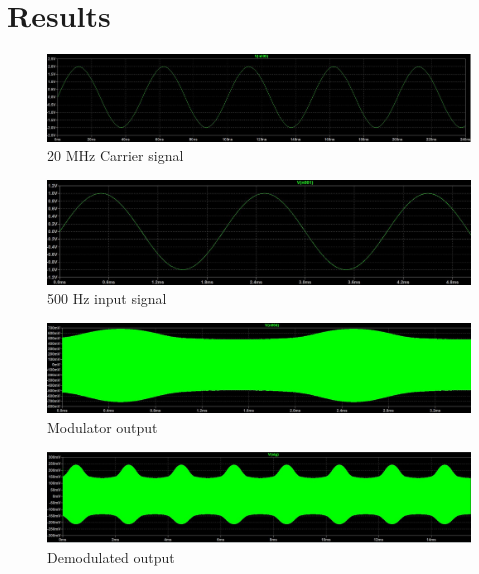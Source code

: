 \documentclass[12pt, a4paper]{article}
\begin{document}

\section{Results} %
\label{sec:results}
	\begin{figure}[H]
		\centering
		\includegraphics[width=\textwidth]{images/carrier.JPG}
		\caption{20 MHz Carrier signal}
		\label{fig:carrier}
	\end{figure}

	\begin{figure}[H]
		\centering
		\includegraphics[width=\textwidth]{images/modulating.JPG}
		\caption{500 Hz input signal}
		\label{fig:modulating}
	\end{figure}

	\begin{figure}[H]
		\centering
		\includegraphics[width=\textwidth]{images/output_modulated.JPG}
		\caption{Modulator output}
		\label{fig:output_modulated}
	\end{figure}

	\begin{figure}[H]
		\centering
		\includegraphics[width=\textwidth]{images/output_demodulated.JPG}
		\caption{Demodulated output}
		\label{fig:output_demodulated}
	\end{figure}
\end{document}
